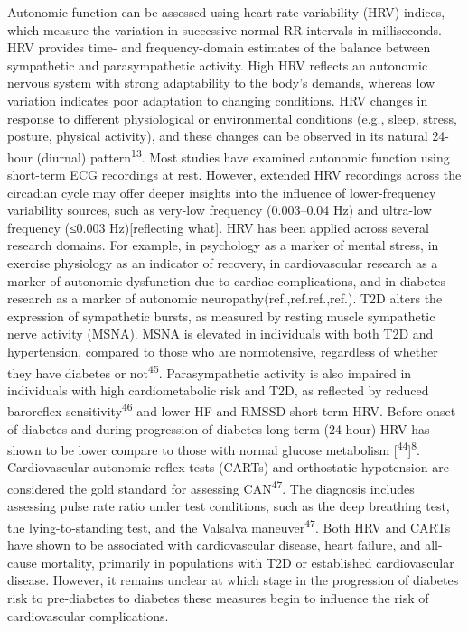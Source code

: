 \documentclass[
  a4paper,
  headsepline=true,
  open=any]{scrbook}
\begin{document}
Autonomic function can be assessed using heart rate variability (HRV)
indices, which measure the variation in successive normal RR intervals
in milliseconds. HRV provides time- and frequency-domain estimates of
the balance between sympathetic and parasympathetic activity. High HRV
reflects an autonomic nervous system with strong adaptability to the
body's demands, whereas low variation indicates poor adaptation to
changing conditions. HRV changes in response to different physiological
or environmental conditions (e.g., sleep, stress, posture, physical
activity), and these changes can be observed in its natural 24-hour
(diurnal) pattern\textsuperscript{13}. Most studies have examined
autonomic function using short-term ECG recordings at rest. However,
extended HRV recordings across the circadian cycle may offer deeper
insights into the influence of lower-frequency variability sources, such
as very-low frequency (0.003--0.04 Hz) and ultra-low frequency (≤0.003
Hz){[}reflecting what{]}. HRV has been applied across several research
domains. For example, in psychology as a marker of mental stress, in
exercise physiology as an indicator of recovery, in cardiovascular
research as a marker of autonomic dysfunction due to cardiac
complications, and in diabetes research as a marker of autonomic
neuropathy(ref.,ref.ref.,ref.). T2D alters the expression of sympathetic
bursts, as measured by resting muscle sympathetic nerve activity (MSNA).
MSNA is elevated in individuals with both T2D and hypertension, compared
to those who are normotensive, regardless of whether they have diabetes
or not\textsuperscript{45}. Parasympathetic activity is also impaired in
individuals with high cardiometabolic risk and T2D, as reflected by
reduced baroreflex sensitivity\textsuperscript{46} and lower HF and
RMSSD short-term HRV. Before onset of diabetes and during progression of
diabetes long-term (24-hour) HRV has shown to be lower compare to those
with normal glucose metabolism
{[}\textsuperscript{44}{]}\textsuperscript{8}. Cardiovascular autonomic
reflex tests (CARTs) and orthostatic hypotension are considered the gold
standard for assessing CAN\textsuperscript{47}. The diagnosis includes
assessing pulse rate ratio under test conditions, such as the deep
breathing test, the lying-to-standing test, and the Valsalva
maneuver\textsuperscript{47}. Both HRV and CARTs have shown to be
associated with cardiovascular disease, heart failure, and all-cause
mortality, primarily in populations with T2D or established
cardiovascular disease. However, it remains unclear at which stage in
the progression of diabetes risk to pre-diabetes to diabetes these
measures begin to influence the risk of cardiovascular complications.
\end{document}
